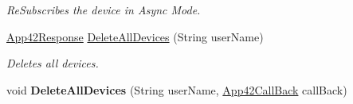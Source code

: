 \begin{DoxyCompactItemize}
\begin{DoxyCompactList}\small\item\em Re\+Subscribes the device in Async Mode. \end{DoxyCompactList}\item 
\hyperlink{classcom_1_1shephertz_1_1app42_1_1paas_1_1sdk_1_1csharp_1_1_app42_response}{App42\+Response} \hyperlink{classcom_1_1shephertz_1_1app42_1_1paas_1_1sdk_1_1csharp_1_1push_notification_1_1_push_notification_service_a0139ac659ee88e1160366199b98065f0}{Delete\+All\+Devices} (String user\+Name)
\begin{DoxyCompactList}\small\item\em Deletes all devices. \end{DoxyCompactList}\item 
\hypertarget{classcom_1_1shephertz_1_1app42_1_1paas_1_1sdk_1_1csharp_1_1push_notification_1_1_push_notification_service_af01fcdc01a191bf71cac20ca577ed7f9}{void {\bfseries Delete\+All\+Devices} (String user\+Name, \hyperlink{interfacecom_1_1shephertz_1_1app42_1_1paas_1_1sdk_1_1csharp_1_1_app42_call_back}{App42\+Call\+Back} call\+Back)}\label{classcom_1_1shephertz_1_1app42_1_1paas_1_1sdk_1_1csharp_1_1push_notification_1_1_push_notification_service_af01fcdc01a191bf71cac20ca577ed7f9}


\end{DoxyCompactItemize}
